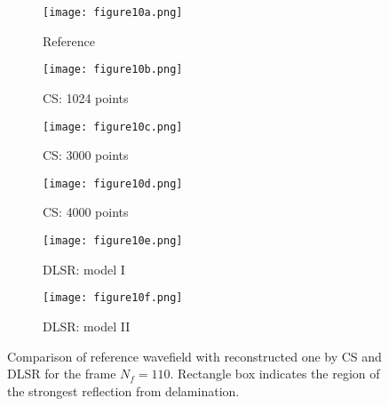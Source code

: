 \begin{figure} [!ht]
	\centering
	\begin{subfigure}[b]{0.32\textwidth}
		\centering
		\texttt{[image: figure10a.png]}
		\caption{Reference}
		\label{fig:frame110_ref}
	\end{subfigure}
	\hfill
	\begin{subfigure}[b]{0.32\textwidth}
		\centering
		\texttt{[image: figure10b.png]}
		\caption{CS: 1024 points}
		\label{fig:frame110_CS1024}
	\end{subfigure}
	\hfill
	\begin{subfigure}[b]{0.32\textwidth}
		\centering
		\texttt{[image: figure10c.png]}
		\caption{CS: 3000 points}
		\label{fig:frame110_CS3000}
	\end{subfigure}	
	\hfill
	\begin{subfigure}[b]{0.32\textwidth}
		\centering
		\texttt{[image: figure10d.png]}
		\caption{CS: 4000 points}
		\label{fig:frame110_CS4000}
	\end{subfigure}
	\hfill
	\begin{subfigure}[b]{0.32\textwidth}
		\centering
		\texttt{[image: figure10e.png]}
		\caption{DLSR: model I}
		\label{fig:frame110_Abdalraheem}
	\end{subfigure}
	\hfill
	\begin{subfigure}[b]{0.32\textwidth}
		\centering
		\texttt{[image: figure10f.png]}
		\caption{DLSR: model II}
		\label{fig:frame110_Saeed}
	\end{subfigure}
	
	\caption{Comparison of reference wavefield with reconstructed one by CS and DLSR for the frame $N_f = 110$. Rectangle box indicates the region of the strongest reflection from delamination.}
	\label{fig:frame110_comparison}
\end{figure} 

